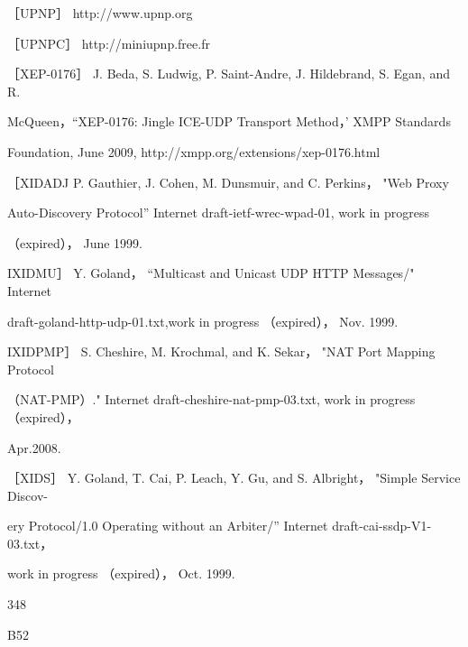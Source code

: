 ［UPNP］ http://www.upnp.org

［UPNPC］ http://miniupnp.free.fr

［XEP-0176］ J. Beda, S. Ludwig, P. Saint-Andre, J. Hildebrand, S. Egan, and R.

McQueen，“XEP-0176: Jingle ICE-UDP Transport Method，' XMPP Standards

Foundation, June 2009, http://xmpp.org/extensions/xep-0176.html

［XIDADJ P. Gauthier, J. Cohen, M. Dunsmuir, and C. Perkins， "Web Proxy

Auto-Discovery Protocol” Internet draft-ietf-wrec-wpad-01, work in progress

（expired）， June 1999.

IXIDMU］ Y. Goland， “Multicast and Unicast UDP HTTP Messages/" Internet

draft-goland-http-udp-01.txt,work in progress （expired）， Nov. 1999.

IXIDPMP］ S. Cheshire, M. Krochmal, and K. Sekar， "NAT Port Mapping Protocol

（NAT-PMP）." Internet draft-cheshire-nat-pmp-03.txt, work in progress （expired），

Apr.2008.

［XIDS］ Y. Goland, T. Cai, P. Leach, Y. Gu, and S. Albright， "Simple Service Discov-

ery Protocol/1.0 Operating without an Arbiter/” Internet draft-cai-ssdp-V1-03.txt，

work in progress （expired）， Oct. 1999.

348

B52